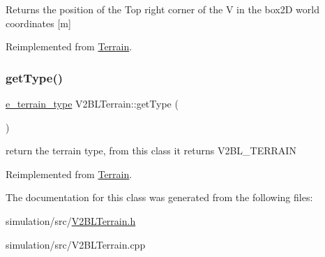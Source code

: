 \begin{DoxyReturn}{Returns}
the position of the Top right corner of the V in the box2D world coordinates \mbox{[}m\mbox{]} 
\end{DoxyReturn}


Reimplemented from \mbox{\hyperlink{class_terrain_a10fcf414cba83e769d99156fe16aa795}{Terrain}}.

\mbox{\label{class_v2_b_l_terrain_a4ac0574a992aadd7cfcad6eba6b55000}} 
\subsubsection{\texorpdfstring{get\+Type()}{getType()}}
{\footnotesize\ttfamily \mbox{\hyperlink{_terrain_8h_a6d0b7e83bb7325270c1162bece970fd8}{e\+\_\+terrain\+\_\+type}} V2\+B\+L\+Terrain\+::get\+Type (\begin{DoxyParamCaption}{ }\end{DoxyParamCaption})\hspace{0.3cm}{\ttfamily [virtual]}}

return the terrain type, from this class it returns V2\+B\+L\+\_\+\+T\+E\+R\+R\+A\+IN 

Reimplemented from \mbox{\hyperlink{class_terrain_a6cd1220b8e64466cc7a2219efff4141b}{Terrain}}.



The documentation for this class was generated from the following files\+:\begin{DoxyCompactItemize}
\item 
simulation/src/\mbox{\hyperlink{_v2_b_l_terrain_8h}{V2\+B\+L\+Terrain.\+h}}\item 
simulation/src/V2\+B\+L\+Terrain.\+cpp\end{DoxyCompactItemize}
